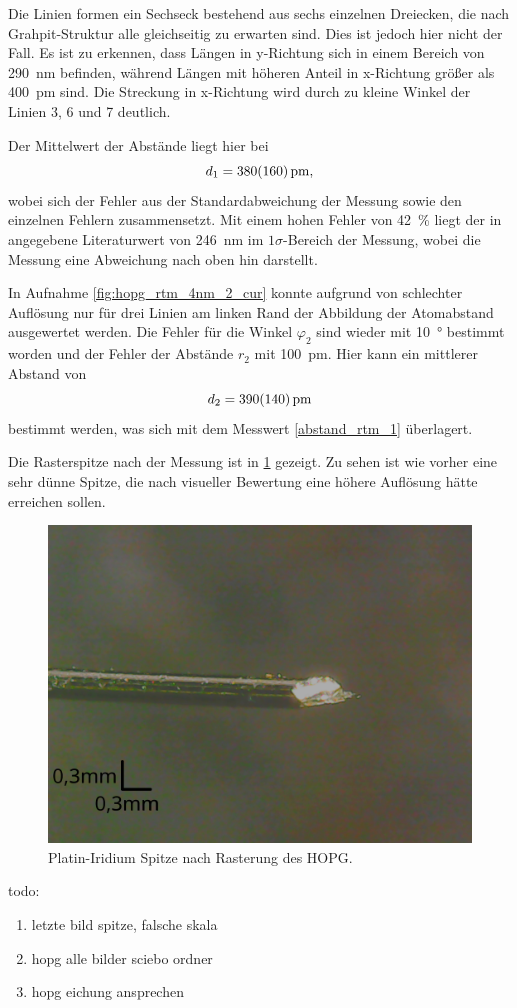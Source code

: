 Die Linien formen ein Sechseck bestehend aus sechs einzelnen Dreiecken, die nach Grahpit-Struktur alle 
gleichseitig zu erwarten sind. Dies ist jedoch hier nicht der Fall. Es ist zu erkennen, dass Längen 
in y-Richtung sich in einem Bereich von \SI{290}{\nm} befinden, während Längen mit höheren Anteil 
in x-Richtung größer als \SI{400}{\pm} sind. Die Streckung in x-Richtung wird durch zu kleine Winkel 
der Linien 3, 6 und 7 deutlich.\par 
Der Mittelwert der Abstände liegt hier bei 
\begin{equation}
	d_1 = \SI{380\pm 160}{\pm}, 
	\label{abstand_rtm_1}
\end{equation}
wobei sich der Fehler aus der Standardabweichung der Messung sowie den einzelnen Fehlern zusammensetzt. 
Mit einem hohen Fehler von \SI{42}{\percent} liegt der in \cite{skript} angegebene Literaturwert von 
\SI{246}{\nm}
im $1\sigma$-Bereich der Messung, wobei die Messung eine Abweichung nach oben hin darstellt.\\\par 

In Aufnahme \ref{fig:hopg_rtm_4nm_2_cur} konnte aufgrund von schlechter Auflösung 
nur für drei Linien am linken Rand der Abbildung der Atomabstand ausgewertet werden. Die Fehler für 
die Winkel $\varphi_2$ sind wieder mit \SI{10}{\degree} bestimmt worden und der 
Fehler der Abstände $r_2$ mit \SI{100}{\pm}. Hier kann ein mittlerer Abstand von 
\begin{equation}
	d_2 = \SI{390\pm140}{\pm}
	\label{abstand_rtm_2}
\end{equation}
bestimmt werden, was sich mit dem Messwert \ref{abstand_rtm_1} überlagert.



Die Rasterspitze nach der Messung ist in \cref{fig:spitze_hopg_nachher} gezeigt. Zu sehen ist 
wie vorher eine sehr dünne Spitze, die nach visueller Bewertung eine höhere Auflösung hätte erreichen sollen.

\begin{figure}[htb]
	\centering
	\includegraphics[width=0.5\linewidth]{figs/spitze_hopg_nachher_v2}
	\caption{Platin-Iridium Spitze nach Rasterung des HOPG.}
	\label{fig:spitze_hopg_nachher}
\end{figure}

todo: 
\begin{enumerate}
	\item letzte bild spitze, falsche skala
	\item hopg alle bilder sciebo ordner
	\item hopg eichung ansprechen
\end{enumerate}

